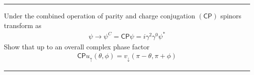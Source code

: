 \noindent\rule{7in}{1.5pt}


\begin{problem}{4.14}
Under the combined operation of parity and charge conjugation $(\mathsf{CP})$ spinors transform as
\begin{align*}
    \psi \to \psi^C = \mathsf{CP} \psi = i \gamma^2\gamma^0 \psi^\ast 
\end{align*}
Show that up to an overall complex phase factor
\begin{align*}
    \mathsf{CP} u_\uparrow \left( \theta,\phi \right) = v_\downarrow  \left( \pi-\theta,\pi+\phi \right)
\end{align*}
\end{problem}
\begin{solution}

\end{solution}

\noindent\rule{7in}{1.5pt}


